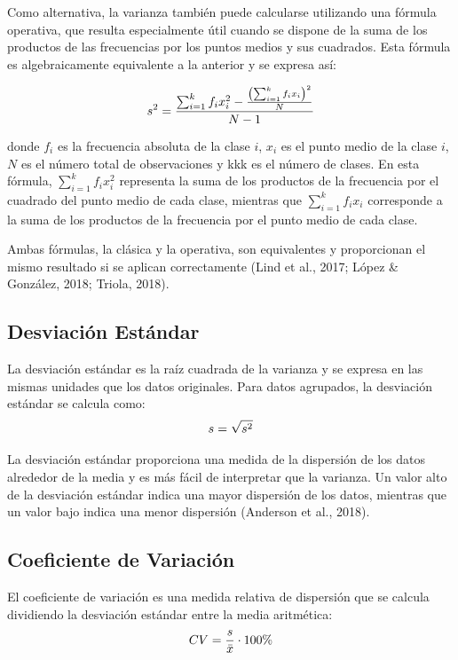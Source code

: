 \documentclass[
  spanish,
  letterpaper,
]{book}
\begin{document}
Como alternativa, la varianza también puede calcularse utilizando una
fórmula operativa, que resulta especialmente útil cuando se dispone de
la suma de los productos de las frecuencias por los puntos medios y sus
cuadrados. Esta fórmula es algebraicamente equivalente a la anterior y
se expresa así:

\[ \LARGE s^2 = \frac{\sum_{i=1}^{k} f_i x_i^2 - \frac{\left(\sum_{i=1}^{k} f_i x_i\right)^2}{N}}{N - 1}\]

donde \(f_i\)\hspace{0pt} es la frecuencia absoluta de la clase \(i\),
\(x_i\)\hspace{0pt} es el punto medio de la clase \(i\), \(N\) es el
número total de observaciones y kkk es el número de clases. En esta
fórmula, \(\sum_{i=1}^{k} f_i x_i^2\) representa la suma de los
productos de la frecuencia por el cuadrado del punto medio de cada
clase, mientras que \(\sum_{i=1}^{k} f_i x_i\) corresponde a la suma de
los productos de la frecuencia por el punto medio de cada clase.

Ambas fórmulas, la clásica y la operativa, son equivalentes y
proporcionan el mismo resultado si se aplican correctamente (Lind et
al., 2017; López \& González, 2018; Triola, 2018).

\subsection{Desviación Estándar}\label{desviaciuxf3n-estuxe1ndar-2}

La desviación estándar es la raíz cuadrada de la varianza y se expresa
en las mismas unidades que los datos originales. Para datos agrupados,
la desviación estándar se calcula como: \[\huge s = \sqrt{s^2}\]

La desviación estándar proporciona una medida de la dispersión de los
datos alrededor de la media y es más fácil de interpretar que la
varianza. Un valor alto de la desviación estándar indica una mayor
dispersión de los datos, mientras que un valor bajo indica una menor
dispersión (Anderson et al., 2018).

\subsection{Coeficiente de
Variación}\label{coeficiente-de-variaciuxf3n-2}

El coeficiente de variación es una medida relativa de dispersión que se
calcula dividiendo la desviación estándar entre la media aritmética:
\[ \huge CV = \frac{s}{\bar{x}} \cdot 100\%\]
\end{document}
